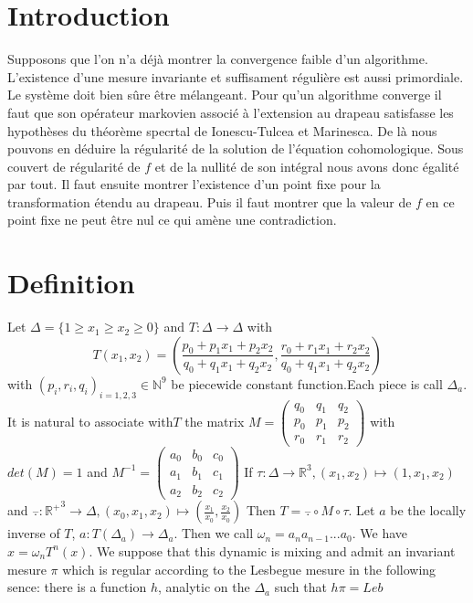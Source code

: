 \documentclass[12pt]{article}
\theoremstyle{plain}%
\theoremstyle{definition}
\theoremstyle{remark}
\begin{document}
\tableofcontents
\section*{Introduction}
Supposons que l'on n'a déjà montrer la convergence faible d'un algorithme.
L'existence d'une mesure invariante et suffisament régulière est aussi primordiale.
Le système doit bien sûre être mélangeant.
Pour qu'un algorithme converge il faut que son opérateur markovien associé à l'extension au drapeau satisfasse les hypothèses du théorème specrtal de Ionescu-Tulcea et Marinesca.
De là nous pouvons en déduire la régularité de la solution de l'équation cohomologique.
Sous couvert de régularité de $f$ et de la nullité de son intégral nous avons donc égalité par tout. Il faut ensuite montrer l'existence d'un point fixe pour la transformation étendu au drapeau.
Puis il faut montrer que la valeur de $f$ en ce point fixe ne peut être nul ce qui amène une contradiction.
\section{Definition}
Let $\Delta=\{ 1 \geq x_1 \geq x_2 \geq 0 \}$ and $T:\Delta \to \Delta$ with \[ T(x_1,x_2)=(\frac{p_0+p_1 x_1+p_2 x_2}{q_0+q_1 x_1 +q_2 x_2},\frac{r_0+r_1 x_1+r_2 x_2}{q_0+q_1 x_1 +q_2 x_2}) \] with $(p_i,r_i,q_i)_{i=1,2,3}\in \mathbb{N}^9$ be piecewide constant function.Each piece is call $\Delta_a$. It is natural to associate with$T $ the matrix $M=\begin{pmatrix} q_0 & q_1 & q_2 \\ p_0 & p_1 & p_2 \\ r_0 & r_1 & r_2 \end{pmatrix}$ with $det(M)=1$ and $M^{-1}=\begin{pmatrix} a_0 & b_0 & c_0 \\ a_1 & b_1 & c_1 \\ a_2 & b_2 & c_2 \end{pmatrix}$
If $\tau: \Delta \to \mathbb{R}^3, (x_1,x_2) \mapsto (1,x_1,x_2)$ and $\overset{-}{.}: \mathbb{R^+}^3 \to \Delta,(x_0,x_1,x_2) \mapsto (\frac{x_1}{x_0},\frac{x_2}{x_0})$
Then $T=\overset{-}{.} \circ M \circ \tau$.\newline
Let $a$ be the locally inverse of $T$, $a:T(\Delta_a) \to \Delta_a$. Then we call $\omega_n=a_n a_{n-1} ... a_0$.\newline
We have $x=\omega_n T^n(x)$.
\newline
\color{green}
We suppose that this dynamic is mixing and admit an invariant mesure $\pi$ which is regular according to the Lesbegue mesure in the following sence: there is a function $h$, analytic on the $\Delta_a$ such that $h \pi= Leb$
\color{black}
\end{document}
